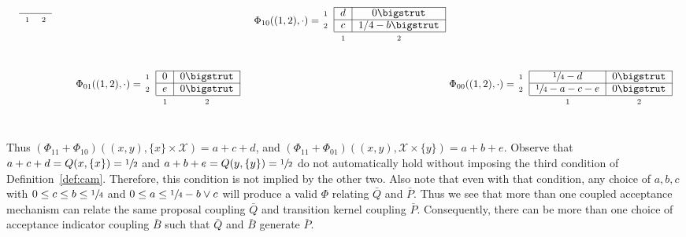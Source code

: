\documentclass[aihp]{imsart}
\theoremstyle{plain}
\theoremstyle{remark}
\theoremstyle{definition} \newtheorem{example}{Example}
\newcommand{\calX}{\mathcal{X}}
\newcommand{\cd}{\cdot}
\newcommand{\bp}{\bar P}
\newcommand{\bq}{\bar Q}
\newcommand{\bb}{\bar B}
\newcommand{\sx}{\{ x \}}
\newcommand{\sy}{\{ y \}}
\newcommand{\xy}{(x,y)}
\newcommand{\h}{\sfrac{1}{2}}
\begin{document}
\begin{appendix}
\begin{alignat*}{2}
\begin{blockarray}{rcc}
\begin{block}{ r |c|c| }
			\cline{2-3}
		\end{block}
		\  & {\scriptstyle 1} & {\scriptstyle 2}
	\end{blockarray}
	\qquad
	&& \raisebox{3pt}{ $ \Phi_{10}((1,2), \cd) = $ } \hspace{-5pt}
	\begin{blockarray}{rcc} \\
		\begin{block}{ r |c|c| }
			\cline{2-3}
			{\scriptstyle 1}  & d & 0 \bigstrut  \\
			\cline{2-3}
			{\scriptstyle 2} & c & 1/4	- b \bigstrut  \\
			\cline{2-3}
		\end{block}
		\  & {\scriptstyle 1} & {\scriptstyle 2}
	\end{blockarray} \\
	& \raisebox{3pt}{ $ \Phi_{01}((1,2), \cd) = $ } \hspace{-5pt}
	\begin{blockarray}{rcc} \\
		\begin{block}{ r |c|c| }
			\cline{2-3}
			{\scriptstyle 1}  & 0 & 0 \bigstrut  \\
			\cline{2-3}
			{\scriptstyle 2} & e & 0 \bigstrut  \\
			\cline{2-3}
		\end{block}
		\  & {\scriptstyle 1} & {\scriptstyle 2}
	\end{blockarray}
	&& \raisebox{3pt}{ $ \Phi_{00}((1,2), \cd) = $ } \hspace{-5pt}
	\begin{blockarray}{rcc} \\
		\begin{block}{ r |c|c| }
			\cline{2-3}
			{\scriptstyle 1}  & \sfrac{1}{4}-d & 0 \bigstrut  \\
			\cline{2-3}
			{\scriptstyle 2} & \sfrac{1}{4}-a-c-e & 0 \bigstrut  \\
			\cline{2-3}
		\end{block}
		\  & {\scriptstyle 1} & {\scriptstyle 2}
	\end{blockarray}
	\\	\end{alignat*}\\[-3em]
Thus $(\Phi_{11} + \Phi_{10})(\xy, \sx \times \calX) = a + c + d$, and  $(\Phi_{11} +
\Phi_{01})(\xy, \calX \times \sy) = a + b + e$. Observe that ${a + c + d} = Q(x, \sx) = \h$ and $a +
b + e = Q(y, \sy) = \h$ do not automatically hold without imposing the third condition of
Definition~\ref{def:cam}. Therefore, this condition is not implied by the other two. Also note that
even with that condition, any choice of $a,b,c$ with $0 \leq c \leq b \leq \sfrac{1}{4}$ and $0 \leq
a \leq \sfrac{1}{4} - b \vee c$ will produce a valid $\Phi$ relating $\bq$ and $\bp$. Thus we see
that more than one coupled acceptance mechanism can relate the same proposal coupling $\bq$ and
transition kernel coupling $\bp$. Consequently, there can be more than one
choice of acceptance indicator coupling $\bb$ such that $\bq$ and $\bb$ generate $\bp$.


\end{appendix}
\end{document}
